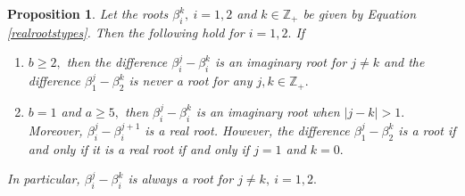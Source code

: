 \documentclass[12pt,reqno]{amsart}
\theoremstyle{plain}
\newtheorem{prop}{Proposition}
\theoremstyle{definition}
\theoremstyle{remark}
\newcommand\bz{\mathbb Z}
\begin{document}
\begin{prop}\label{keyproppos}
    Let the roots $\beta_{i}^{k},\ i=1,2$ and $k\in \bz_+$ be given by Equation \ref{realrootstypes}. Then the following hold for $i=1,2.$ If 
    \begin{enumerate}
        \item $b\geq 2,$ then the difference $\beta_{i}^{j}-\beta_{i}^{k}$ is an imaginary root for $j\neq k$ and the difference $\beta_{1}^{j}-\beta_{2}^{k}$ is never a root for any $j,k\in\bz_+.$
        \item $b=1$ and $a\geq 5,$ then $\beta_{i}^{j}-\beta_{i}^{k}$ is an imaginary root when $|j-k|>1.$ Moreover, $\beta_{i}^{j}-\beta_{i}^{j+1}$ is a real root. However, the difference $\beta_{1}^{j}-\beta_{2}^{k}$ is a root if and only if it is a real root if and only if $j=1$ and $k=0.$
    \end{enumerate}
    In particular, $\beta_{i}^{j}-\beta_{i}^{k}$ is always a root for $j\neq k,\ i=1,2.$
\end{prop}
\end{document}
